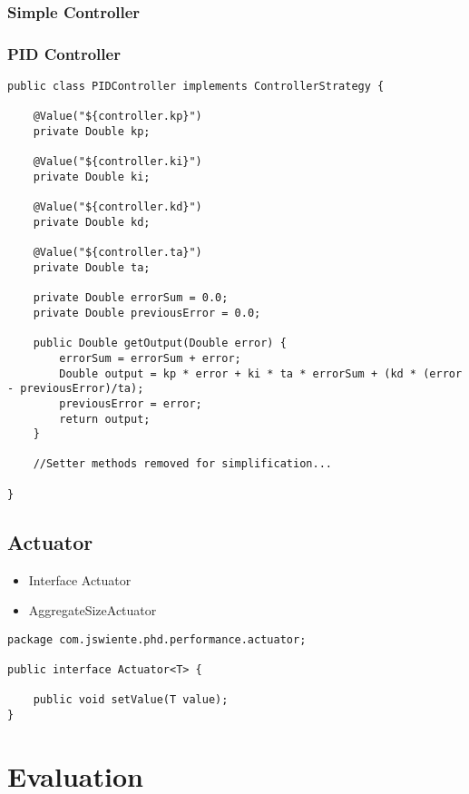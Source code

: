 \subsubsection{Simple Controller}

\subsubsection{PID Controller}

\begin{lstlisting}[caption={Implementation of PID Controller},label=listing:ch5_pid_controller]
public class PIDController implements ControllerStrategy {
	
	@Value("${controller.kp}")
	private Double kp;
	
	@Value("${controller.ki}")
	private Double ki;
	
	@Value("${controller.kd}")
	private Double kd;
	
	@Value("${controller.ta}")
	private Double ta;
	
	private Double errorSum = 0.0;
	private Double previousError = 0.0;

	public Double getOutput(Double error) {
		errorSum = errorSum + error;
		Double output = kp * error + ki * ta * errorSum + (kd * (error - previousError)/ta);
		previousError = error;
		return output;
	}

	//Setter methods removed for simplification...

}

\end{lstlisting}

\subsection{Actuator}

\begin{itemize}
	\item Interface Actuator
	\item AggregateSizeActuator
\end{itemize}
\begin{lstlisting}[caption={Actuator Interface},label=listing:ch5_pid_controller]
package com.jswiente.phd.performance.actuator;

public interface Actuator<T> {

	public void setValue(T value);
}
\end{lstlisting}

\section{Evaluation}

